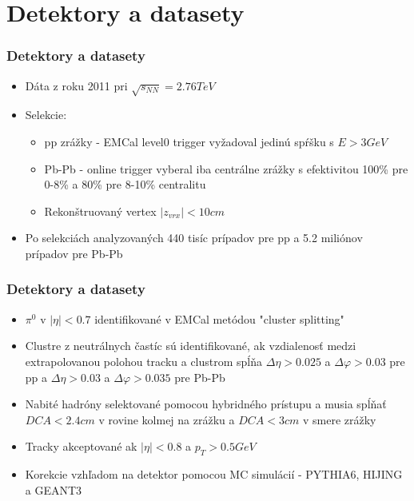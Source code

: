 \documentclass{beamer}
\begin{document}
	\section{Detektory a datasety}
	\begin{frame}
		\frametitle{Detektory a datasety}
		\begin{itemize}	
			\item Dáta z roku 2011 pri $\sqrt{s_{NN}}=2.76TeV$
			\item Selekcie:
			\begin{itemize}	
				\item pp zrážky - EMCal level0 trigger vyžadoval jedinú spŕšku s $E>3GeV$
				\item Pb-Pb - online trigger vyberal iba centrálne zrážky s efektivitou 100\% pre 0-8\% a 80\% pre 8-10\% centralitu
				\item Rekonštruovaný vertex $\lvert z_{vrx}\rvert<10cm$
			\end{itemize}	
			\item Po selekciách analyzovaných 440 tisíc prípadov pre pp a 5.2 miliónov prípadov pre Pb-Pb
		\end{itemize}

	\end{frame}
	
	
	\begin{frame}
		\frametitle{Detektory a datasety}
		\begin{itemize}
			\item $\pi^{0}$ v $\lvert\eta\rvert<0.7$ identifikované v EMCal metódou "cluster splitting"
			\item Clustre z neutrálnych častíc sú identifikované, ak vzdialenosť medzi extrapolovanou polohou tracku a clustrom spĺňa $\Delta \eta >0.025$ a 
			$\Delta \varphi >0.03$ pre pp a $\Delta \eta >0.03$ a $\Delta \varphi >0.035$ pre Pb-Pb
			\item Nabité hadróny selektované pomocou hybridného prístupu a musia spĺňať $DCA < 2.4 cm$ v rovine kolmej na zrážku a $DCA < 3 cm$ v smere zrážky
			\item Tracky akceptované ak $\lvert\eta\rvert<0.8$ a $p_T>0.5 GeV$
			\item Korekcie vzhľadom na detektor pomocou MC simulácií - PYTHIA6, HIJING a GEANT3
		\end{itemize}
	\end{frame}
	
\end{document}
